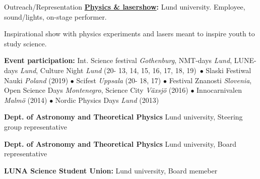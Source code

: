 \begin{rubric}{Outreach/Representation}
\entry*[2013 - current]%
\textbf{\href{https://www.facebook.com/Physicsandlasershow}{Physics \& lasershow}:} Lund university. Employee, sound/lights, on-stage performer. \par Inspirational show with physics experiments and lasers meant to inspire youth to study science. \par
\textbf{Event participation:} Int. Science festival \textit{Gothenburg}, NMT-days \textit{Lund}, LUNE-days \textit{Lund}, Culture Night \textit{Lund} (20- 13, 14, 15, 16, 17, 18, 19)\ $\bullet$ Slaski Festiwal Nauki \textit{Poland} (2019)  $\bullet$ Scifest \textit{Uppsala} (20- 18, 17) $\bullet$ Festival Znanosti \textit{Slovenia}, Open Science Days \textit{Montenegro}, Science City \textit{Växsjö} (2016) $\bullet$ Innocarnivalen \textit{Malmö} (2014) $\bullet$ Nordic Physics Days \textit{Lund} (2013)

\entry*[2020-current]%
\textbf{Dept. of Astronomy and Theoretical Physics} Lund university, Steering group representative \par

\entry*[2017-2018]%
\textbf{Dept. of Astronomy and Theoretical Physics} Lund university, Board representative \par

\entry*[2013-2015]%
\textbf{LUNA Science Student Union:} Lund university, Board memeber \par

\end{rubric}